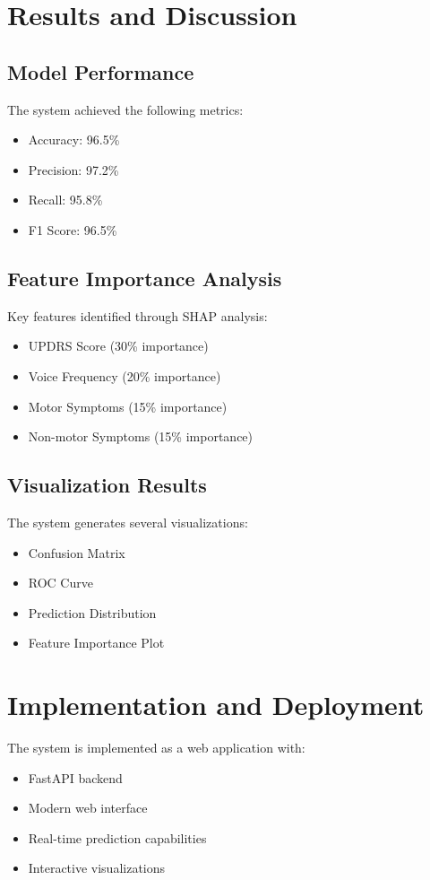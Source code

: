 \documentclass[conference]{IEEEtran}
\begin{document}
\section{Results and Discussion}

\subsection{Model Performance}
The system achieved the following metrics:
\begin{itemize}
    \item Accuracy: 96.5\%
    \item Precision: 97.2\%
    \item Recall: 95.8\%
    \item F1 Score: 96.5\%
\end{itemize}

\subsection{Feature Importance Analysis}
Key features identified through SHAP analysis:
\begin{itemize}
    \item UPDRS Score (30\% importance)
    \item Voice Frequency (20\% importance)
    \item Motor Symptoms (15\% importance)
    \item Non-motor Symptoms (15\% importance)
\end{itemize}

\subsection{Visualization Results}
The system generates several visualizations:
\begin{itemize}
    \item Confusion Matrix
    \item ROC Curve
    \item Prediction Distribution
    \item Feature Importance Plot
\end{itemize}

\section{Implementation and Deployment}
The system is implemented as a web application with:
\begin{itemize}
    \item FastAPI backend
    \item Modern web interface
    \item Real-time prediction capabilities
    \item Interactive visualizations
\end{itemize}
\end{document}
